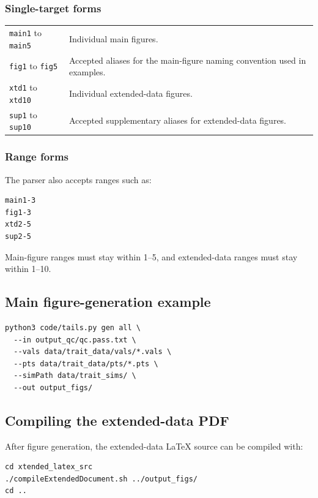 \documentclass[11pt]{article}
\begin{document}
\subsubsection*{Single-target forms}

\begin{longtable}{p{3cm}p{11cm}}
\texttt{main1} to \texttt{main5} & Individual main figures. \\
\texttt{fig1} to \texttt{fig5} & Accepted aliases for the main-figure naming convention used in examples. \\
\texttt{xtd1} to \texttt{xtd10} & Individual extended-data figures. \\
\texttt{sup1} to \texttt{sup10} & Accepted supplementary aliases for extended-data figures. \\
\end{longtable}

\subsubsection*{Range forms}

The parser also accepts ranges such as:

\begin{verbatim}
main1-3
fig1-3
xtd2-5
sup2-5
\end{verbatim}

Main-figure ranges must stay within 1--5, and extended-data ranges must stay within 1--10.

\subsection{Main figure-generation example}

\begin{verbatim}
python3 code/tails.py gen all \
  --in output_qc/qc.pass.txt \
  --vals data/trait_data/vals/*.vals \
  --pts data/trait_data/pts/*.pts \
  --simPath data/trait_sims/ \
  --out output_figs/
\end{verbatim}

\subsection{Compiling the extended-data PDF}

After figure generation, the extended-data LaTeX source can be compiled with:

\begin{verbatim}
cd xtended_latex_src
./compileExtendedDocument.sh ../output_figs/
cd ..
\end{verbatim}
\end{document}
